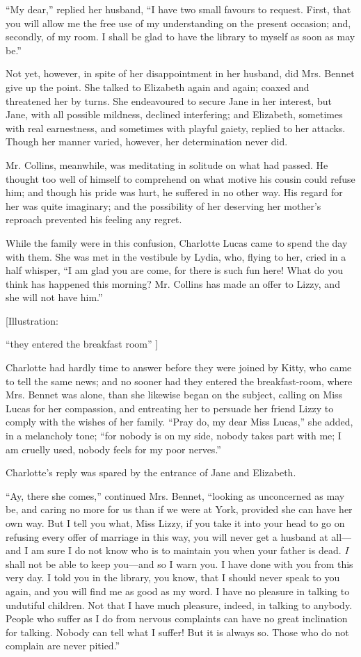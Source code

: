 \documentclass[12pt]{book}
\begin{document}
``My dear,'' replied her husband, ``I have two small favours to request. First, that you will allow me the free use of my understanding on the present occasion; and, secondly, of my room. I shall be glad to have the library to myself as soon as may be.''

Not yet, however, in spite of her disappointment in her husband, did Mrs. Bennet give up the point. She talked to Elizabeth again and again; coaxed and threatened her by turns. She endeavoured to secure Jane in her interest, but Jane, with all possible mildness, declined interfering; and Elizabeth, sometimes with real earnestness, and sometimes with playful gaiety, replied to her attacks. Though her manner varied, however, her determination never did.

Mr. Collins, meanwhile, was meditating in solitude on what had passed. He thought too well of himself to comprehend on what motive his cousin could refuse him; and though his pride was hurt, he suffered in no other way. His regard for her was quite imaginary; and the possibility of her deserving her mother's reproach prevented his feeling any regret.

While the family were in this confusion, Charlotte Lucas came to spend the day with them. She was met in the vestibule by Lydia, who, flying to her, cried in a half whisper, ``I am glad you are come, for there is such fun here! What do you think has happened this morning? Mr. Collins has made an offer to Lizzy, and she will not have him.''

[Illustration:

``they entered the breakfast room'' ]

Charlotte had hardly time to answer before they were joined by Kitty, who came to tell the same news; and no sooner had they entered the breakfast-room, where Mrs. Bennet was alone, than she likewise began on the subject, calling on Miss Lucas for her compassion, and entreating her to persuade her friend Lizzy to comply with the wishes of her family. ``Pray do, my dear Miss Lucas,'' she added, in a melancholy tone; ``for nobody is on my side, nobody takes part with me; I am cruelly used, nobody feels for my poor nerves.''

Charlotte's reply was spared by the entrance of Jane and Elizabeth.

``Ay, there she comes,'' continued Mrs. Bennet, ``looking as unconcerned as may be, and caring no more for us than if we were at York, provided she can have her own way. But I tell you what, Miss Lizzy, if you take it into your head to go on refusing every offer of marriage in this way, you will never get a husband at all---and I am sure I do not know who is to maintain you when your father is dead. \textit{I} shall not be able to keep you---and so I warn you. I have done with you from this very day. I told you in the library, you know, that I should never speak to you again, and you will find me as good as my word. I have no pleasure in talking to undutiful children. Not that I have much pleasure, indeed, in talking to anybody. People who suffer as I do from nervous complaints can have no great inclination for talking. Nobody can tell what I suffer! But it is always so. Those who do not complain are never pitied.''
\end{document}
